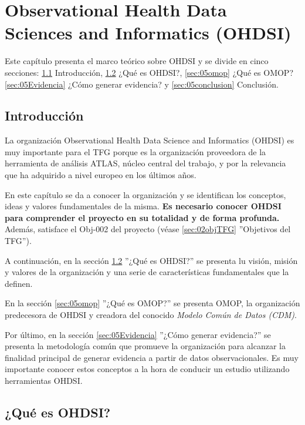 \chapter{Observational Health Data Sciences and Informatics (OHDSI)}\label{cap:05OHDSI}

Este capítulo presenta el marco teórico sobre OHDSI y se divide en cinco secciones:  \ref{sec:05intro} Introducción, \ref{sec:05OHDSI} ¿Qué es OHDSI?, \ref{sec:05omop} ¿Qué es OMOP? \ref{sec:05Evidencia} ¿Cómo generar evidencia? y \ref{sec:05conclusion} Conclusión.

\section{Introducción} \label{sec:05intro}

La organización Observational Health Data Science and Informatics (OHDSI) es muy importante para el TFG porque es la organización proveedora de la herramienta de análisis ATLAS, núcleo central del trabajo, y por la relevancia que ha adquirido a nivel europeo en los últimos años.

En este capítulo se da a conocer la organización y se identifican los conceptos, ideas y valores fundamentales de la misma. \textbf{Es necesario conocer OHDSI para comprender el proyecto en su totalidad y de forma profunda.} Además, satisface el Obj-002 del proyecto (véase \ref{sec:02objTFG} ''Objetivos del TFG'').

A continuación, en la sección \ref{sec:05OHDSI} ''¿Qué es OHDSI?'' se presenta lu visión, misión y valores de la organización y una serie de características fundamentales que la definen. 

En la sección \ref{sec:05omop} ''¿Qué es OMOP?'' se presenta  OMOP, la organización predecesora de OHDSI 
y creadora del conocido \textit{Modelo Común de Datos (CDM)}.

Por último, en la sección \ref{sec:05Evidencia} ''¿Cómo generar evidencia?'' se presenta la metodología común que promueve la organización para alcanzar la finalidad principal de generar evidencia a partir de datos observacionales. Es muy importante conocer estos conceptos a la hora de conducir un estudio utilizando herramientas OHDSI.

\section{¿Qué es OHDSI?} \label{sec:05OHDSI}

